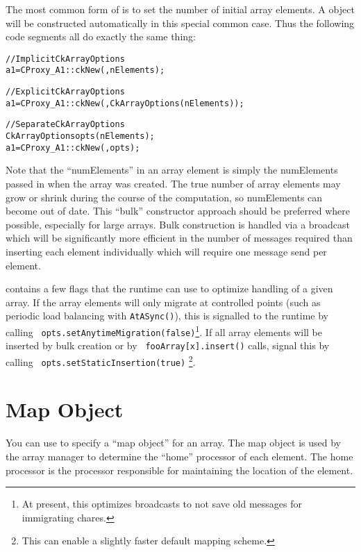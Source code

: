 The most common form of  is to set the number
of initial array elements.  A  object will be 
constructed automatically in this special common case.  Thus
the following code segments all do exactly the same thing:

\begin{alltt}
//Implicit CkArrayOptions
  a1=CProxy_A1::ckNew(,nElements);

//Explicit CkArrayOptions
  a1=CProxy_A1::ckNew(,CkArrayOptions(nElements));

//Separate CkArrayOptions
  CkArrayOptions opts(nElements);
  a1=CProxy_A1::ckNew(,opts);
\end{alltt}

Note that the ``numElements'' in an array element is simply the
numElements passed in when the array was created.  The true number of
array elements may grow or shrink during the course of the
computation, so numElements can become out of date.  This ``bulk''
constructor approach should be preferred where possible, especially
for large arrays.  Bulk construction is handled via a broadcast which
will be significantly more efficient in the number of messages
required than inserting each element individually which will require
one message send per element.

 contains a few flags that the runtime can use to
optimize handling of a given array. If the array elements will only
migrate at controlled points (such as periodic load balancing with
{\tt AtASync()}), this is signalled to the runtime by calling {\tt
  opts.setAnytimeMigration(false)}\footnote{At present, this optimizes
broadcasts to not save old messages for immigrating chares.}. If all
array elements will be inserted by bulk creation or by {\tt
  fooArray[x].insert()} calls, signal this by calling {\tt
  opts.setStaticInsertion(true)} \footnote{This can enable a slightly
  faster default mapping scheme.}.

\section{Map Object}
\label{array map}

You can use  to specify a ``map object''
for an array.  The map object is used by the array manager
to determine the ``home'' processor of each element.  The
home processor is the processor responsible for maintaining
the location of the element.

